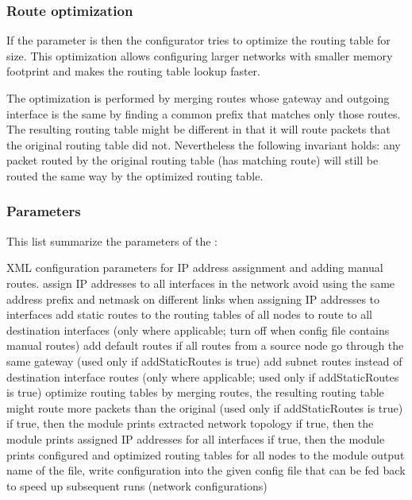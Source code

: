 \subsubsection*{Route optimization}

If the  parameter is  then the
configurator tries to optimize the routing table for size.
This optimization allows configuring larger networks with smaller
memory footprint and makes the routing table lookup faster.

The optimization is performed by merging routes whose gateway and
outgoing interface is the same by finding a common prefix that
matches only those routes. The resulting routing table might be
different in that it will route packets that the original routing table
did not. Nevertheless the following invariant holds: any packet routed
by the original routing table (has matching route) will still be routed
the same way by the optimized routing table.

\subsubsection*{Parameters}

This list summarize the parameters of the :

\begin{params}
   {XML configuration parameters for IP address assignment and adding manual routes.}
   {assign IP addresses to all interfaces in the network}
   {avoid using the same address prefix and
    netmask on different links when assigning IP addresses to interfaces}
   {add static routes to the routing tables of all nodes
    to route to all destination interfaces (only where applicable; turn off when
    config file contains manual routes)}
    {add default routes if all routes from a source node go
     through the same gateway (used only if addStaticRoutes is true)}
   {add subnet routes instead of destination interface routes
    (only where applicable; used only if addStaticRoutes is true)}
   {optimize routing tables by merging routes, the resulting routing table might
    route more packets than the original (used only if addStaticRoutes is true)}
   {if true, then the module prints extracted network topology}
   {if true, then the module prints assigned IP addresses for all interfaces}
   {if true, then the module prints configured and optimized routing tables for all nodes to
    the module output}
   {name of the file, write configuration into the given config file that can be fed back
    to speed up subsequent runs (network configurations)}
\end{params}

